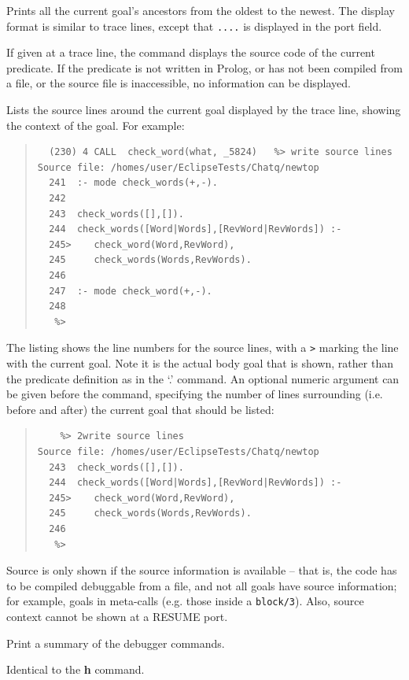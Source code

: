 \begin{descr}{1cm}

Prints all the current goal's ancestors from the oldest to the newest.
The display format is similar to trace lines,
except that {\tt ....} is displayed in the port field.

If given at a trace line, the command displays the source code of the
current predicate.
If the predicate is not written in Prolog, or has not been compiled from
a file, or the source file is inaccessible, no information can be displayed.

Lists the source lines around the current goal displayed by the trace line,
showing the context of the goal. For example:  

\begin{quote}\begin{verbatim}
  (230) 4 CALL  check_word(what, _5824)   %> write source lines
Source file: /homes/user/EclipseTests/Chatq/newtop
  241  :- mode check_words(+,-).
  242  
  243  check_words([],[]).
  244  check_words([Word|Words],[RevWord|RevWords]) :-
  245>    check_word(Word,RevWord),
  245     check_words(Words,RevWords).
  246  
  247  :- mode check_word(+,-).
  248  
   %> 
\end{verbatim}\end{quote}

The listing shows the line numbers for the source lines, with a \verb'>'
marking the line with the current goal. Note it is the actual body goal
that is shown, rather than the predicate definition as in the `.' command.
An optional numeric argument can be given before the command, specifying
the number of lines surrounding (i.e. before and after) the current goal
that should be listed:

\begin{quote}\begin{verbatim}
    %> 2write source lines
Source file: /homes/user/EclipseTests/Chatq/newtop
  243  check_words([],[]).
  244  check_words([Word|Words],[RevWord|RevWords]) :-
  245>    check_word(Word,RevWord),
  245     check_words(Words,RevWords).
  246  
   %> 
\end{verbatim}\end{quote}

Source is only shown if the source information is available -- that is, 
the code has to be compiled debuggable from a file, and not all goals have 
source information; for example, goals in meta-calls (e.g. those inside a 
{\tt block/3}). Also, source context cannot be shown at a RESUME port.

Print a summary of the debugger commands.

Identical to the {\bf h} command.

\end{descr}


